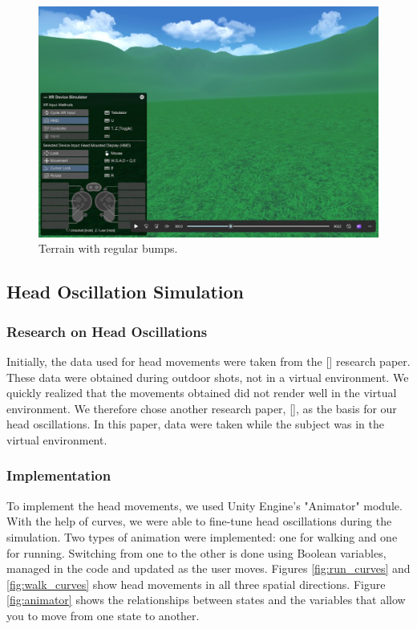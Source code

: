 \documentclass[american]{acmtog} %
\begin{document}
\begin{figure}[H]
\centerline{\includegraphics[width=\columnwidth]{figures/regular_terrain.png}}
\caption{Terrain with regular bumps.}
    \label{fig:regular_terrain}
\end{figure}

\subsection{Head Oscillation Simulation}
\subsubsection{Research on Head Oscillations}
Initially, the data used for head movements were taken from the [\cite{translational_motion}] research paper. These data were obtained during outdoor shots, not in a virtual environment. We quickly realized that the movements obtained did not render well in the virtual environment. We therefore chose another research paper, [\cite{trigger_walking}], as the basis for our head oscillations. In this paper, data were taken while the subject was in the virtual environment.

\subsubsection{Implementation}
To implement the head movements, we used Unity Engine's "Animator" module. With the help of curves, we were able to fine-tune head oscillations during the simulation. Two types of animation were implemented: one for walking and one for running. Switching from one to the other is done using Boolean variables, managed in the code and updated as the user moves. Figures \ref{fig:run_curves} and \ref{fig:walk_curves} show head movements in all three spatial directions. Figure \ref{fig:animator} shows the relationships between states and the variables that allow you to move from one state to another.
\end{document}

